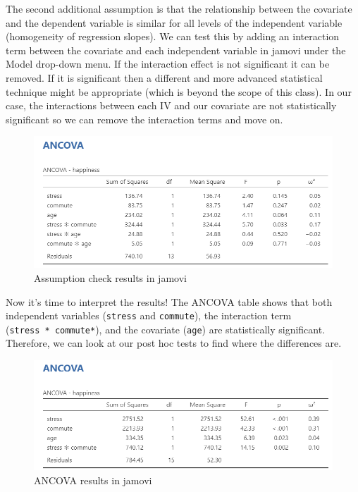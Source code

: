 \documentclass[
]{book}
\begin{document}
The second additional assumption is that the relationship between the covariate and the dependent variable is similar for all levels of the independent variable (homogeneity of regression slopes). We can test this by adding an interaction term between the covariate and each independent variable in jamovi under the Model drop-down menu. If the interaction effect is not significant it can be removed. If it is significant then a different and more advanced statistical technique might be appropriate (which is beyond the scope of this class). In our case, the interactions between each IV and our covariate are not statistically significant so we can remove the interaction terms and move on.

\begin{figure}

{\centering \includegraphics[width=1\linewidth]{images/07-ancova/ancova_assumptions3} 

}

\caption{Assumption check results in jamovi}\label{fig:unnamed-chunk-3}
\end{figure}

Now it's time to interpret the results! The ANCOVA table shows that both independent variables (\texttt{stress} and \texttt{commute}), the interaction term (\texttt{stress\ *\ commute*}), and the covariate (\texttt{age}) are statistically significant. Therefore, we can look at our post hoc tests to find where the differences are.

\begin{figure}

{\centering \includegraphics[width=1\linewidth]{images/07-ancova/ancova_results} 

}

\caption{ANCOVA results in jamovi}\label{fig:unnamed-chunk-4}
\end{figure}
\end{document}
